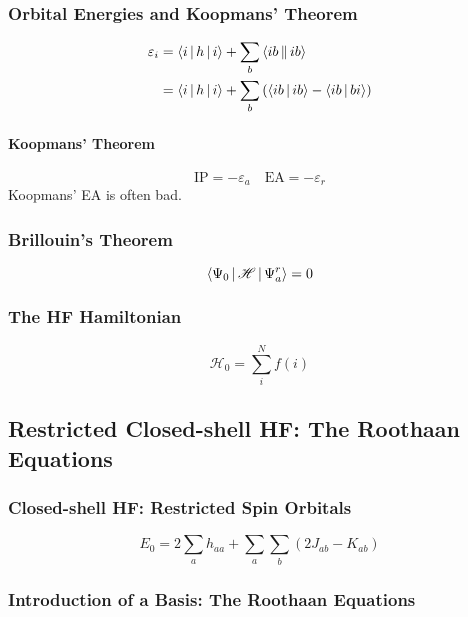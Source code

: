 \documentclass[a4paper]{article}
\numberwithin{equation}{section}
\begin{document}
\subsubsection{Orbital Energies and Koopmans' Theorem}
\begin{align}\label{key}
\varepsilon_i &= \Braket{i|h|i} + \sum_b \Braket{ib||ib} \\
&= \Braket{i|h|i} + \sum_b \qty(\Braket{ib|ib} - \Braket{ib|bi})
\end{align}
\paragraph{Koopmans' Theorem}
\begin{equation}\label{key}
\text{IP} = -\varepsilon_a \quad 
\text{EA} = -\varepsilon_r
\end{equation}
Koopmans' EA is often bad.
\subsubsection{Brillouin's Theorem}
\begin{equation}\label{key}
\Braket{\Psi_0 | \mathscr{H} | \Psi_a^r} = 0
\end{equation}

\subsubsection{The HF Hamiltonian}
\begin{equation}\label{key}
\mathscr{H}_0 = \sum_i^N f(i) 
\end{equation}

\subsection{Restricted Closed-shell HF: The Roothaan Equations}
\subsubsection{Closed-shell HF: Restricted Spin Orbitals}
\begin{equation}\label{key}
E_0 = 2\sum_a h_{aa} + \sum_a\sum_b(2J_{ab} - K_{ab})
\end{equation}

\subsubsection{Introduction of a Basis: The Roothaan Equations}
\end{document}
